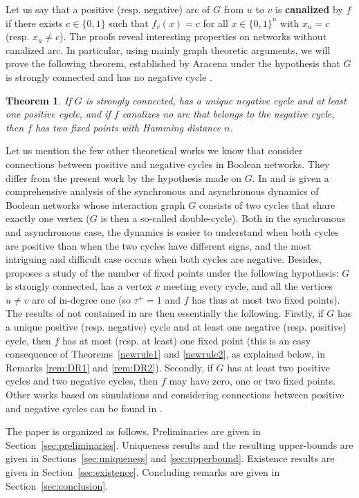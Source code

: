 \documentclass[11pt,a4paper]{article}
\newtheorem{theorem}{Theorem}
\def\B{\{0,1\}}
\begin{document}
\medskip
Let us say that a positive (resp. negative) arc of $G$ from $u$ to $v$ is {\bf canalized} by $f$ if there exists $c\in\B$ such that $f_v(x)=c$ for all $x\in\B^n$ with $x_u=c$ (resp. $x_u\neq c$). The proofs reveal interesting properties on networks without canalized arc. In particular, using mainly graph theoretic arguments, we will prove the following theorem, established by Aracena under the hypothesis that $G$ is strongly connected and has no negative cycle \cite[Theorem 6]{A08}. 

\begin{theorem}\label{strong}
If $G$ is strongly connected, has a unique negative cycle and at least one positive cycle, and if $f$ canalizes no arc that belongs to the negative cycle, then $f$ has two fixed points with Hamming distance $n$. 
\end{theorem}

Let us mention the few other theoretical works we know that consider connections between positive and negative cycles in Boolean networks. They differ from the present work by the hypothesis made on $G$. In \cite{DNS12} and \cite{MNR14} is given a comprehensive analysis of the synchronous and asynchronous dynamics of Boolean networks whose interaction graph $G$ consists of two cycles that share exactly one vertex ($G$ is then a so-called double-cycle). Both in the synchronous and asynchronous case, the dynamics is easier to understand when both cycles are positive than when the two cycles have different signs, and the most intriguing and difficult case occurs when both cycles are negative. Besides, \cite{DR12} proposes a study of the number of fixed points under the following hypothesis: $G$ is strongly connected, has a vertex $v$ meeting every cycle, and all the vertices $u\neq v$ are of in-degree one (so $\tau^+= 1$ and $f$ has thus at most two fixed points). The results of \cite{DR12} not contained in \cite{A08} are then essentially the following. Firstly, if $G$ has a unique positive (resp. negative) cycle and at least one negative (resp. positive) cycle, then $f$ has at most (resp. at least) one fixed point (this is an easy consequence of Theorems~\ref{newrule1} and \ref{newrule2}, as explained below, in Remarks \ref{rem:DR1} and \ref{rem:DR2}). Secondly, if $G$ has at least two positive cycles and two negative cycles, then $f$ may have zero, one or two fixed points. Other works based on simulations and considering connections between positive and negative cycles can be found in \cite{KC07,SVL08}. 

 
\medskip 
The paper is organized as follows. Preliminaries are given in Section~\ref{sec:preliminaries}. Uniqueness results and the resulting upper-bounds are given in Sections~\ref{sec:uniqueness} and \ref{sec:upperbound}. Existence results are given in Section~\ref{sec:existence}. Concluding remarks are given in Section~\ref{sec:conclusion}. 
\end{document}
